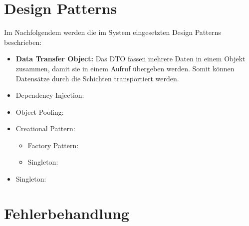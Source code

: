 \section{Design Patterns}
Im Nachfolgendem werden die im System eingesetzten Design Patterns beschrieben:
	\begin{itemize}
		\item \textbf{Data Transfer Object:} Das DTO fassen mehrere Daten in einem Objekt zusammen, damit sie in einem Aufruf übergeben werden. Somit können Datensätze durch die Schichten transportiert werden.
		\item Dependency Injection: 
		\item Object Pooling:
		\item Creational Pattern:
			\begin{itemize}
				\item Factory Pattern:
				\item Singleton:
			\end{itemize}
		\item Singleton:
	\end{itemize}
\section{Fehlerbehandlung}		     

